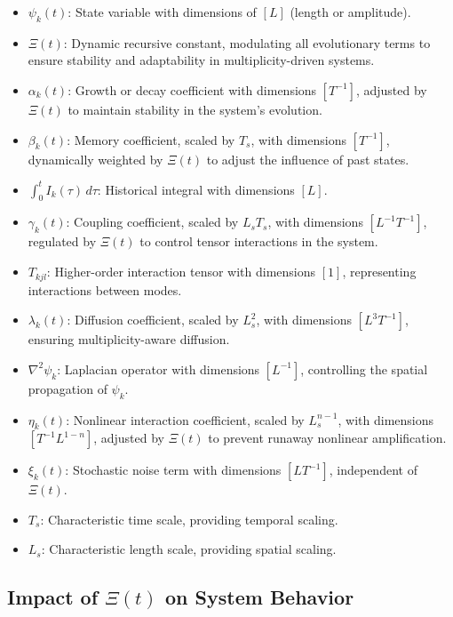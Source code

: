 \documentclass{article}
\theoremstyle{plain}
\begin{document}
\begin{itemize}
\begin{itemize}
    \item \( \psi_k(t) \): State variable with dimensions of \( [L] \) (length or amplitude).
    \item \(\Xi(t) \): Dynamic recursive constant, modulating all evolutionary terms to ensure stability and adaptability in multiplicity-driven systems.
    \item \( \alpha_k(t) \): Growth or decay coefficient with dimensions \( [T^{-1}] \), adjusted by \(\Xi(t) \) to maintain stability in the system's evolution.
    \item \( \beta_k(t) \): Memory coefficient, scaled by \( T_s \), with dimensions \( [T^{-1}] \), dynamically weighted by \(\Xi(t) \) to adjust the influence of past states.
    \item \( \int_0^t I_k(\tau) \, d\tau \): Historical integral with dimensions \( [L] \).
    \item \( \gamma_k(t) \): Coupling coefficient, scaled by \( L_s T_s \), with dimensions \( [L^{-1} T^{-1}] \), regulated by \(\Xi(t) \) to control tensor interactions in the system.
    \item \( T_{kjl} \): Higher-order interaction tensor with dimensions \( [1] \), representing interactions between modes.
    \item \( \lambda_k(t) \): Diffusion coefficient, scaled by \( L_s^2 \), with dimensions \( [L^3 T^{-1}] \), ensuring multiplicity-aware diffusion.
    \item \( \nabla^2 \psi_k \): Laplacian operator with dimensions \( [L^{-1}] \), controlling the spatial propagation of \( \psi_k \).
    \item \( \eta_k(t) \): Nonlinear interaction coefficient, scaled by \( L_s^{n-1} \), with dimensions \( [T^{-1} L^{1-n}] \), adjusted by \(\Xi(t) \) to prevent runaway nonlinear amplification.
    \item \( \xi_k(t) \): Stochastic noise term with dimensions \( [L T^{-1}] \), independent of \(\Xi(t) \).
    \item \( T_s \): Characteristic time scale, providing temporal scaling.
    \item \( L_s \): Characteristic length scale, providing spatial scaling.
\end{itemize}

\subsection{Impact of \(\Xi(t) \) on System Behavior}


\end{itemize}
\end{document}
